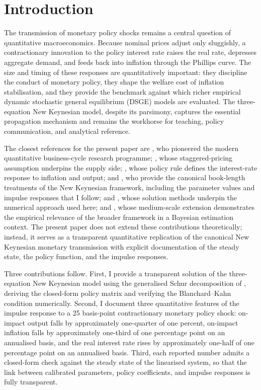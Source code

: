 \section{Introduction}
\label{sec:introduction}

The transmission of monetary policy shocks remains a central question of
quantitative macroeconomics. Because nominal prices adjust only sluggishly,
a contractionary innovation to the policy interest rate raises the real
rate, depresses aggregate demand, and feeds back into inflation through
the Phillips curve. The size and timing of these responses are
quantitatively important: they discipline the conduct of monetary policy,
they shape the welfare cost of inflation stabilisation, and they provide
the benchmark against which richer empirical dynamic stochastic general
equilibrium (DSGE) models are evaluated. The three-equation New Keynesian
model, despite its parsimony, captures the essential propagation
mechanism and remains the workhorse for teaching, policy communication,
and analytical reference.

The closest references for the present paper are
\citet{KydlandPrescott1982}, who pioneered the modern quantitative
business-cycle research programme; \citet{Calvo1983}, whose
staggered-pricing assumption underpins the supply side; \citet{Taylor1993},
whose policy rule defines the interest-rate response to inflation and
output; \citet{Woodford2003} and \citet{Gali2008}, who provide the
canonical book-length treatments of the New Keynesian framework, including
the parameter values and impulse responses that I follow; \citet{Klein2000}
and \citet{BlanchardKahn1980}, whose solution methods underpin the
numerical approach used here; and \citet{SmetsWouters2007}, whose
medium-scale extension demonstrates the empirical relevance of the
broader framework in a Bayesian estimation context. The present paper
does not extend these contributions theoretically; instead, it serves as
a transparent quantitative replication of the canonical New Keynesian
monetary transmission with explicit documentation of the steady state,
the policy function, and the impulse responses.

Three contributions follow. First, I provide a transparent solution of
the three-equation New Keynesian model using the generalised Schur
decomposition of \citet{Klein2000}, deriving the closed-form policy
matrix and verifying the Blanchard--Kahn condition numerically. Second,
I document three quantitative features of the impulse response to a 25
basis-point contractionary monetary policy shock: on-impact output falls
by approximately one-quarter of one percent, on-impact inflation falls
by approximately one-third of one percentage point on an annualised
basis, and the real interest rate rises by approximately one-half of one
percentage point on an annualised basis. Third, each reported number
admits a closed-form check against the steady state of the linearised
system, so that the link between calibrated parameters, policy
coefficients, and impulse responses is fully transparent.

